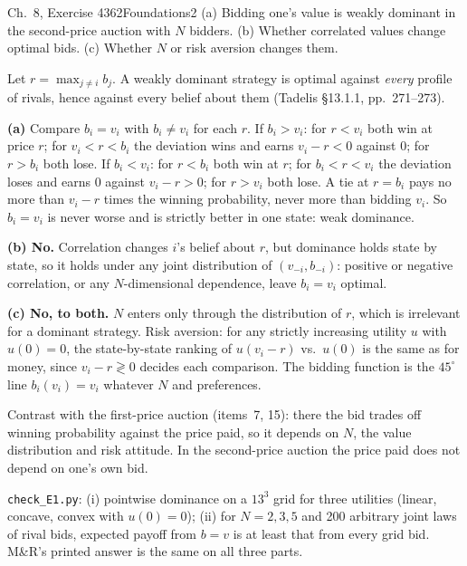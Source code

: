 \begin{exsol}{\MG{} Ch.~8, Exercise 4}{362}{Foundations}{2}
\asked (a) Bidding one's value is weakly dominant in the second-price auction with $N$ bidders.
(b) Whether correlated values change optimal bids. (c) Whether $N$ or risk aversion changes them.

\method Let $r=\max_{j\ne i}b_j$. A weakly dominant strategy is optimal against \emph{every}
profile of rivals, hence against every belief about them (Tadelis \S13.1.1, pp.~271--273).

\solution
\textbf{(a)} Compare $b_i=v_i$ with $b_i\ne v_i$ for each $r$. If $b_i>v_i$: for $r<v_i$ both win
at price $r$; for $v_i<r<b_i$ the deviation wins and earns $v_i-r<0$ against $0$; for $r>b_i$ both
lose. If $b_i<v_i$: for $r<b_i$ both win at $r$; for $b_i<r<v_i$ the deviation loses and earns $0$
against $v_i-r>0$; for $r>v_i$ both lose. A tie at $r=b_i$ pays no more than $v_i-r$ times the
winning probability, never more than bidding $v_i$. So $b_i=v_i$ is never worse and is strictly
better in one state: weak dominance.

\textbf{(b) No.} Correlation changes $i$'s belief about $r$, but dominance holds state by state,
so it holds under any joint distribution of $(v_{-i},b_{-i})$: positive or negative
correlation, or any $N$-dimensional dependence, leave $b_i=v_i$ optimal.

\textbf{(c) No, to both.} $N$ enters only through the distribution of $r$, which is irrelevant for a
dominant strategy. Risk aversion: for any strictly increasing utility $u$ with $u(0)=0$, the
state-by-state ranking of $u(v_i-r)$ vs.\ $u(0)$ is the same as for money, since $v_i-r\gtrless 0$
decides each comparison. The bidding function is the $45^\circ$ line $b_i(v_i)=v_i$ whatever
$N$ and preferences.

\interp Contrast with the first-price auction (items~7, 15): there the bid trades off winning
probability against the price paid, so it depends on $N$, the value distribution and risk
attitude. In the second-price auction the price paid does not depend on one's own bid.

\verify \texttt{check\_E1.py}: (i) pointwise dominance on a $13^3$ grid for three utilities
(linear, concave, convex with $u(0)=0$); (ii) for $N=2,3,5$ and 200 arbitrary joint laws of
rival bids, expected payoff from $b=v$ is at least that from every grid bid. M\&R's printed
answer is the same on all three parts.

\end{exsol}
